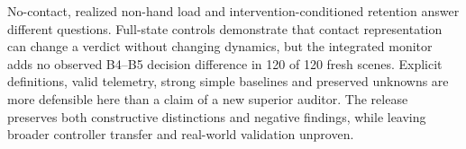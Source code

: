 No-contact, realized non-hand load and intervention-conditioned retention answer different questions. Full-state controls demonstrate that contact representation can change a verdict without changing dynamics, but the integrated monitor adds no observed B4--B5 decision difference in 120 of 120 fresh scenes. Explicit definitions, valid telemetry, strong simple baselines and preserved unknowns are more defensible here than a claim of a new superior auditor. The release preserves both constructive distinctions and negative findings, while leaving broader controller transfer and real-world validation unproven.
